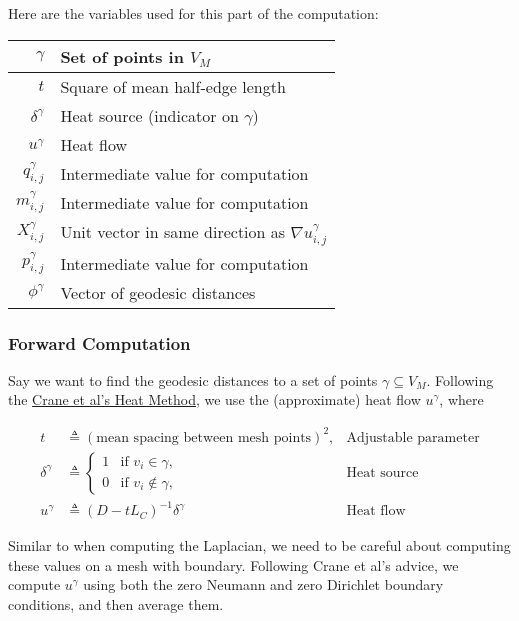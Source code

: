 Here are the variables used for this part of the computation: \begin{center}\begin{tabular}{r|l}
	\(\gamma\) & Set of points in \(V_M\) \\ \hline
	\(t\) & Square of mean half-edge length \\ \hline
	\(\delta^\gamma\) & Heat source (indicator on \(\gamma\)) \\ \hline
	\(u^\gamma\) & Heat flow \\ \hline
	\(q^\gamma_{i, j}\) & Intermediate value for computation \\ \hline
	\(m^\gamma_{i, j}\) & Intermediate value for computation \\ \hline
	\(X^\gamma_{i, j}\) & Unit vector in same direction as \(\nabla u^\gamma_{i, j}\) \\ \hline
	\(p^\gamma_{i, j}\) & Intermediate value for computation \\ \hline
	\(\phi^\gamma\) & Vector of geodesic distances
\end{tabular}\end{center}

\subsubsection{Forward Computation}

Say we want to find the geodesic distances to a set of points \(\gamma \subseteq V_M\). Following the \href{https://www.cs.cmu.edu/~kmcrane/Projects/HeatMethod/}{Crane et al's Heat Method}, we use the (approximate) heat flow \(u^\gamma\), where

\begin{align*}
	t &\triangleq (\text{mean spacing between mesh points})^2, & \text{Adjustable parameter} \\
	\delta^\gamma &\triangleq \begin{cases}
		1 & \text{if $v_i \in \gamma$}, \\
		0 & \text{if $v_i \not\in \gamma$},
	\end{cases} & \text{Heat source} \\
	u^\gamma &\triangleq (D - tL_C)^{-1}\delta^\gamma & \text{Heat flow}
\end{align*}

Similar to when computing the Laplacian, we need to be careful about computing these values on a mesh with boundary. Following Crane et al's advice, we compute $u^\gamma$ using both the zero Neumann and zero Dirichlet boundary conditions, and then average them.


